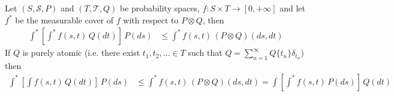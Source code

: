 \begin{thm}\label{FubiniOuterExpectation}Let $(S, \mathcal{S}, P)$ and $(T, \mathcal{T}, Q)$ be probability spaces, $f : S \times T \to [0, +\infty]$ and let $f^*$ be the measurable cover of $f$ with respect to $P \otimes Q$, then 
\begin{align*}
\int^* \left [ \int^* f(s,t) \, Q(dt) \right ] \, P(ds) &\leq \int^* f(s,t) \, (P \otimes Q)(ds,dt)
\end{align*}
If $Q$ is purely atomic (i.e. there exist $t_1, t_2, \dotsc \in T$ such that $Q = \sum_{n=1}^\infty Q \lbrace t_n \rbrace \delta_{t_n}$) then 
\begin{align*}
\int^* \left [ \int f(s,t) \, Q(dt) \right ] \, P(ds) &\leq \int^* f(s,t) \, (P \otimes Q)(ds,dt) = \int \left [ \int^* f(s,t) \, P(ds) \right ] \, Q(dt) 
\end{align*}
\end{thm}
